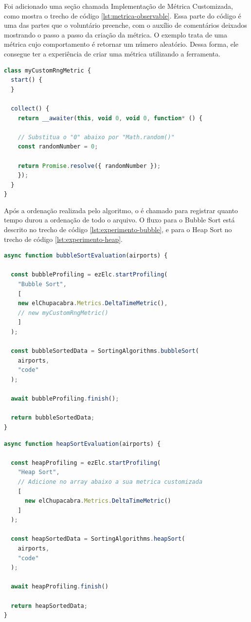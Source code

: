 \documentclass[12pt]{tcc}
\begin{document}
	Foi adicionado uma seção chamada Implementação de Métrica Customizada, como mostra o trecho de código \ref{lst:metrica-observable}. Essa parte do código é uma das partes que o voluntário preenche, com o auxílio de comentários deixados mostrando o passo a passo da criação da métrica. O exemplo trata de uma métrica cujo comportamento é retornar um número aleatório. Dessa forma, ele consegue ter a experiência de criar uma métrica utilizando a ferramenta.


\begin{lstlisting}[label={lst:metrica-observable}, caption={Seção para criação de métrica customizada pelo usuário no experimento.}, language=TypeScript, breaklines=true]
class myCustomRngMetric {
  start() {
  }

  collect() {
    return __awaiter(this, void 0, void 0, function* () {

    // Substitua o "0" abaixo por "Math.random()"
    const randomNumber = 0;

    return Promise.resolve({ randomNumber });
    });
  }
}
\end{lstlisting}


	Após a ordenação realizada pelo algoritmo, o  é chamado para registrar quanto tempo durou a ordenação de todo o arquivo. O fluxo para o Bubble Sort está descrito no trecho de código \ref{lst:experimento-bubble}, e para o Heap Sort no trecho de código \ref{lst:experimento-heap}.


\begin{lstlisting}[label={lst:experimento-bubble}, caption={Fluxo de código referente a execução da ordenação com o Bubble Sort.}, language=TypeScript, breaklines=true]
async function bubbleSortEvaluation(airports) {

  const bubbleProfiling = ezElc.startProfiling(
    "Bubble Sort",
    [
    new elChupacabra.Metrics.DeltaTimeMetric(),
    // new myCustomRngMetric()
    ]
  );

  const bubbleSortedData = SortingAlgorithms.bubbleSort(
    airports,
    "code"
  );

  await bubbleProfiling.finish();
    
  return bubbleSortedData;
}
\end{lstlisting}

\begin{minipage}{\linewidth}
\begin{lstlisting}[label={lst:experimento-heap}, caption={Fluxo de código referente a execução da ordenação com o Heap Sort.}, language=TypeScript, breaklines=true]
async function heapSortEvaluation(airports) {

  const heapProfiling = ezElc.startProfiling(
    "Heap Sort",
    // Adicione no array abaixo a sua metrica customizada
    [
      new elChupacabra.Metrics.DeltaTimeMetric()
    ]
  );

  const heapSortedData = SortingAlgorithms.heapSort(
    airports,
    "code"
  );

  await heapProfiling.finish()
    
  return heapSortedData;
}
\end{lstlisting}
\end{minipage}
\end{document}
